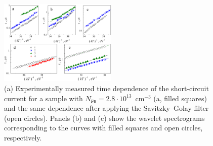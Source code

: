 \documentclass[10pt]{iopart}
\begin{document}
%
%
%
\begin{figure}
\includegraphics[width=0.5\textwidth]{Fig3}
\caption{\label{Fig3}
(a) Experimentally measured time dependence of the short-circuit current for a sample with
$N_\mathtt{Fe}=2.8\cdot10^{13}$~cm$^{-3}$ (a, filled squares) and the same dependence after applying the Savitzky–Golay filter (open circles).
Panels (b) and (c) show the wavelet spectrograms corresponding to the curves with filled squares and open circles, respectively.
}%
\end{figure}
\end{document}

